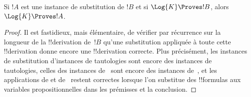 \documentclass[../../../include/open-logic-section]{subfiles}
\begin{document}
\begin{prop}
  Si $!A$ est une instance de substitution de $!B$ et si
  $\Log{K} \Proves !B$, alors $\Log{K} \Proves !A$.
\end{prop}

\begin{proof}
  Il est fastidieux, mais élémentaire, de vérifier par récurrence sur
  la longueur de la !!{derivation} de~$!B$ qu'une substitution
  appliquée à toute cette !!{derivation} donne encore une
  !!{derivation} correcte. Plus précisément, les instances de
  substitution d'instances de tautologies sont encore des instances
  de tautologies, celles des instances de~ sont encore des instances de~, et les applications de \MP{} et de~\Nec{} restent
  correctes lorsque l'on substitue des !!{formula}s aux variables
  propositionnelles dans les prémisses et la conclusion.
\end{proof}
\end{document}
